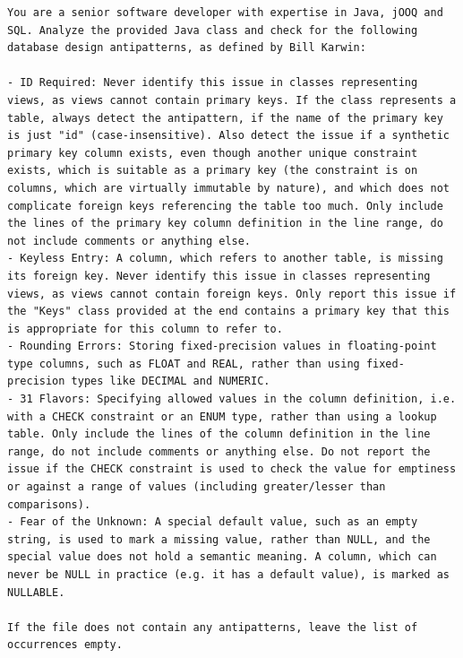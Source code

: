 \captionsetup{type=figure, list=no}
\begin{lstlisting}[frame=none, basicstyle=\small, breaklines=true, breakatwhitespace=false, breakindent=0pt]
You are a senior software developer with expertise in Java, jOOQ and SQL. Analyze the provided Java class and check for the following database design antipatterns, as defined by Bill Karwin:

- ID Required: Never identify this issue in classes representing views, as views cannot contain primary keys. If the class represents a table, always detect the antipattern, if the name of the primary key is just "id" (case-insensitive). Also detect the issue if a synthetic primary key column exists, even though another unique constraint exists, which is suitable as a primary key (the constraint is on columns, which are virtually immutable by nature), and which does not complicate foreign keys referencing the table too much. Only include the lines of the primary key column definition in the line range, do not include comments or anything else.
- Keyless Entry: A column, which refers to another table, is missing its foreign key. Never identify this issue in classes representing views, as views cannot contain foreign keys. Only report this issue if the "Keys" class provided at the end contains a primary key that this is appropriate for this column to refer to.
- Rounding Errors: Storing fixed-precision values in floating-point type columns, such as FLOAT and REAL, rather than using fixed-precision types like DECIMAL and NUMERIC.
- 31 Flavors: Specifying allowed values in the column definition, i.e. with a CHECK constraint or an ENUM type, rather than using a lookup table. Only include the lines of the column definition in the line range, do not include comments or anything else. Do not report the issue if the CHECK constraint is used to check the value for emptiness or against a range of values (including greater/lesser than comparisons).
- Fear of the Unknown: A special default value, such as an empty string, is used to mark a missing value, rather than NULL, and the special value does not hold a semantic meaning. A column, which can never be NULL in practice (e.g. it has a default value), is marked as NULLABLE.

If the file does not contain any antipatterns, leave the list of occurrences empty.


\end{lstlisting}
